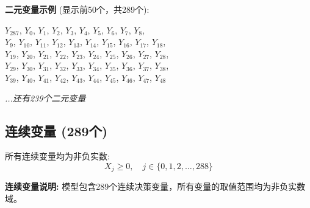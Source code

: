 \documentclass[a4paper,10pt]{article}
\begin{document}
\textbf{二元变量示例} (显示前50个，共289个):

{\small
$Y_{287}$, $Y_{0}$, $Y_{1}$, $Y_{2}$, $Y_{3}$, $Y_{4}$, $Y_{5}$, $Y_{6}$, $Y_{7}$, $Y_{8}$, \\
$Y_{9}$, $Y_{10}$, $Y_{11}$, $Y_{12}$, $Y_{13}$, $Y_{14}$, $Y_{15}$, $Y_{16}$, $Y_{17}$, $Y_{18}$, \\
$Y_{19}$, $Y_{20}$, $Y_{21}$, $Y_{22}$, $Y_{23}$, $Y_{24}$, $Y_{25}$, $Y_{26}$, $Y_{27}$, $Y_{28}$, \\
$Y_{29}$, $Y_{30}$, $Y_{31}$, $Y_{32}$, $Y_{33}$, $Y_{34}$, $Y_{35}$, $Y_{36}$, $Y_{37}$, $Y_{38}$, \\
$Y_{39}$, $Y_{40}$, $Y_{41}$, $Y_{42}$, $Y_{43}$, $Y_{44}$, $Y_{45}$, $Y_{46}$, $Y_{47}$, $Y_{48}$

\textit{...还有239个二元变量}
}

\subsection{连续变量 (289个)}

所有连续变量均为非负实数:
\begin{equation}
X_j \geq 0, \quad j \in \{0, 1, 2, \ldots, 288\}
\end{equation}

\textbf{连续变量说明:} 模型包含289个连续决策变量，所有变量的取值范围均为非负实数域。
\end{document}
